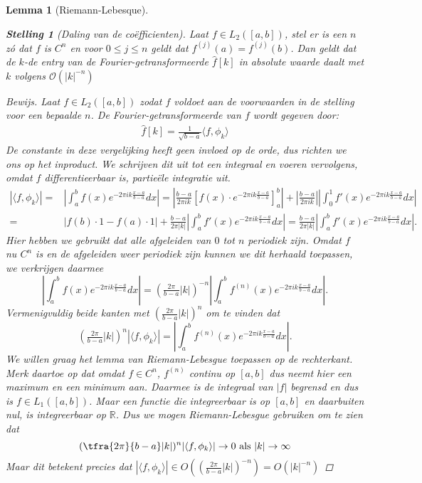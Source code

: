 \documentclass[11pt]{report}
\newcommand{\R}{\mathbb{R}}
\renewcommand{\O}{\mathcal{O}}
\newtheorem*{lemm}{Lemma}
\newtheorem*{stelling}{Stelling}
\theoremstyle{remark}
\newcommand{\eq}[1]{\begin{eqnarray*} #1 \end{eqnarray*}}
\newcommand{\inpr}[2]{\langle #1 , #2 \rangle}
\newcommand{\abso}[1]{{\left| #1 \right|}}
\begin{document}
\begin{lemm}[Riemann-Lebesque]
\begin{stelling}[Daling van de co\"efficienten]
  Laat $f \in L_2([a,b])$, stel er is een $n$ z\'o dat $f$ is $C^n$ en voor $0\leq j\leq n$ geldt dat $f^{(j)}(a) = f^{(j)}(b)$. Dan geldt dat de $k$-de entry van de Fourier-getransformeerde $\hat f[k]$ in absolute waarde
  daalt met $k$ volgens $\O(|k|^{-n})$
\end{stelling}
\begin{proof}[Bewijs]
  Laat $f \in L_2([a,b])$ zodat $f$ voldoet aan de voorwaarden in de stelling voor een bepaalde $n$. 
  De Fourier-getransformeerde van $f$ wordt gegeven door:
  \eq{
    \hat f [k] = \tfrac{1}{\sqrt{b-a}} \inpr{f}{\phi_k}
  }
  De constante in deze vergelijking heeft geen invloed op de orde, dus richten we ons op het inproduct. 
  We schrijven dit uit tot een integraal en voeren vervolgens, omdat $f$ differentieerbaar is, partie\"ele
  integratie uit.
  \eq{
    \abso{\inpr{f}{\phi_k}} 
    =& \abso{\int_a^b f(x) e^{- 2 \pi i k \tfrac{x-a}{b-a}} dx}
    = \abso{\tfrac{b-a}{2 \pi i k}\left[ f(x) \cdot  e^{- 2 \pi i k \tfrac{x-a}{b-a}} \right]_a^b} 
    + \abso{\frac{b-a}{2 \pi i k}\right| \left|\int_0^1 f'(x) e^{-2 \pi i k \tfrac{x-a}{b-a}} dx} \\
    =& \abso{ f(b) \cdot 1 - f(a) \cdot 1} + \frac{b-a}{2 \pi \abso{k}} 
    \abso{ \int_a^b f'(x) e^{-2 \pi i k \tfrac{x-a}{b-a}} dx }
    = \tfrac{b-a}{2 \pi |k|} \left| \int_a^b f'(x) e^{-2 \pi i k \tfrac{x-a}{b-a}} dx \right|.
  }
  Hier hebben we gebruikt dat alle afgeleiden van $0$ tot $n$ periodiek zijn.
  Omdat $f$ nu $C^n$ is en de afgeleiden weer periodiek zijn kunnen we dit herhaald toepassen,
  we verkrijgen daarmee
  \[
  \left| \int_a^b f(x) e^{-2 \pi i k \tfrac{x-a}{b-a}} dx \right| 
  = (\tfrac{2 \pi}{b-a} |k|)^{-n}\left| \int_a^b f^{(n)}(x) e^{- 2 \pi i k \tfrac{x-a}{b-a}} dx \right|.
  \]
  Vermenigvuldig beide kanten met $(\tfrac{2 \pi}{b-a} |k|)^n$ om te vinden dat
  \[
  (\tfrac{2 \pi}{b-a} |k|)^n \abso{\inpr{f}{\phi_k}} 
  = \abso{\int_a^b f^{(n)}(x) e^{- 2 \pi i k \tfrac{x-a}{b-a}} dx}.
  \]
  We willen graag het lemma van Riemann-Lebesgue toepassen op de rechterkant. 
  Merk daartoe op dat omdat $f \in C^n$, $f^{(n)}$ continu op $[a,b]$ 
  dus neemt hier een maximum en een minimum aan. 
  Daarmee is de integraal van $|f|$ begrensd en dus is $f\in L_1([a,b])$. 
  Maar een functie die integreerbaar is op $[a,b]$ en daarbuiten nul, is integreerbaar op $\R$. 
  Dus we mogen Riemann-Lebesgue gebruiken om te zien dat
  \[
  (\tfra{2 \pi}{b-a} |k|)^n \abso{\inpr{f}{\phi_k}} \to 0 \text{ als } |k| \to \infty 
  \]
  Maar dit betekent precies dat $\abso{\inpr{f}{\phi_k}} \in  O((\tfrac{2 \pi}{b-a} |k|)^{-n}) = O(|k|^{-n})$
\end{proof}


\end{lemm}
\end{document}
